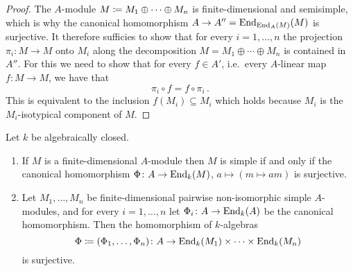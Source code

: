 \begin{proof}
  The $A$-module $M \coloneqq M_1 \oplus \dotsb \oplus M_n$ is finite-dimensional and semisimple, which is why the canonical homomorphism $A \to A'' = \operatorname{End}_{\operatorname{End}_A(M)}(M)$ is surjective.
  It therefore sufficies to show that for every $i = 1, \dotsc, n$ the projection $\pi_i \colon M \to M$ onto $M_i$ along the decomposition $M = M_1 \oplus \dotsb \oplus M_n$ is contained in $A''$.
  For this we need to show that for every $f \in A'$, i.e.\ every $A$-linear map $f \colon M \to M$, we have that
  \[
      \pi_i \circ f
    = f \circ \pi_i \,.
  \]
  This is equivalent to the inclusion $f(M_i) \subseteq M_i$ which holds because $M_i$ is the $M_i$-isotypical component of $M$.
\end{proof}


\begin{theorem}
  \label{theorem: density theorem}
  Let $k$ be algebraically closed.
  \begin{enumerate}
    \item
      \label{enumerate: density theorem for one module}
      If $M$ is a finite-dimensional $A$-module then $M$ is simple if and only if the canonical homomorphism $\Phi \colon A \to \operatorname{End}_k(M)$, $a \mapsto (m \mapsto am)$ is surjective.
    \item
      Let $M_1, \dotsc, M_n$ be finite-dimensional pairwise non-isomorphic simple $A$-modules, and for every $i = 1, \dotsc, n$ let $\Phi_i \colon A \to \operatorname{End}_k(A)$ be the canonical homomorphism.
      Then the homomorphism of $k$-algebras
      \[
                  \Phi
        \coloneqq  (\Phi_1, \dotsc, \Phi_n)
        \colon    A
        \to       \operatorname{End}_k(M_1) \times \dotsb \times \operatorname{End}_k(M_n)
      \]
      is surjective.
  \end{enumerate}
\end{theorem}


